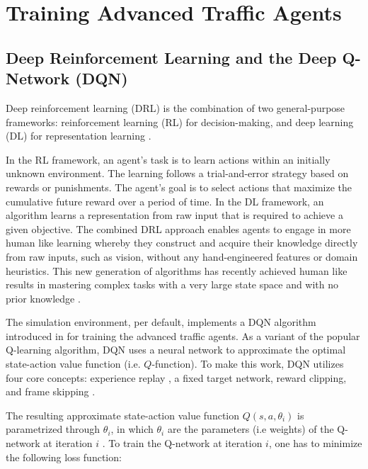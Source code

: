 \documentclass{article}
\begin{document}
\section{Training Advanced Traffic Agents}

\subsection{Deep Reinforcement Learning and the Deep Q-Network (DQN)}
\label{drl-dqn}

Deep reinforcement learning (DRL) is the combination of two general-purpose frameworks: reinforcement learning (RL) for decision-making, and deep learning (DL) for representation learning \cite{Silver.2016}.

In the RL framework, an agent's task is to learn actions within an initially unknown environment. The learning follows a trial-and-error strategy based on rewards or punishments. The agent's goal is to select actions that maximize the cumulative future reward over a period of time. 
In the DL framework, an algorithm learns a representation from raw input that is required to achieve a given objective.  The combined DRL approach enables agents to engage in more human like learning whereby they construct and acquire their knowledge directly from raw inputs, such as vision, without any hand-engineered features or domain heuristics. %
This new generation of algorithms has recently achieved human like results in mastering complex tasks with a very large state space and with no prior knowledge \cite{Mnih.2013,Mnih.2015,Silver.2017}. 

The simulation environment, per default, implements a DQN algorithm introduced in \cite{Mnih.2013,Mnih.2015} for training the advanced traffic agents. As a variant of the popular Q-learning \cite{Watkins.1992} algorithm, DQN uses a neural network to approximate the optimal state-action value function (i.e. $Q$-function). To make this work, DQN utilizes four core concepts: experience replay \cite{Lin.1993}, a fixed target network, reward clipping, and frame skipping \cite{Mnih.2015}. 

The resulting approximate state-action value function $Q(s,a,\theta_i)$ is parametrized through $\theta_i$, in which $\theta_i$ are the parameters (i.e weights) of the Q-network at iteration $i$ \cite{Mnih.2015}. To train the Q-network at iteration $i$, one has to minimize the following loss function:
\end{document}
